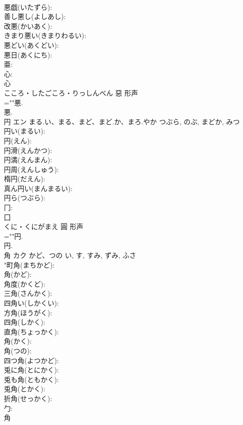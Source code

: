 \documentclass[8pt]{extreport}
\begin{document}
\begin{CJK}{UTF8}{min}
\\	悪戯(いたずら): 
\\	善し悪し(よしあし): 
\\	改悪(かいあく): 
\\	きまり悪い(きまりわるい): 
\\	悪どい(あくどい): 
\\	悪日(あくにち): 
\\	亜: 
\\	心: 
\\	心	
\\	こころ・したごころ・りっしんべん	惡	形声 
\\	=""悪.
\\	悪.
\\	円	エン	まる.い、まる、まど、まど.か、まろ.やか	つぶら, のぶ, まどか, みつ	
\\	円い(まるい): 
\\	円(えん): 
\\	円滑(えんかつ): 
\\	円満(えんまん): 
\\	円周(えんしゅう): 
\\	楕円(だえん): 
\\	真ん円い(まんまるい): 
\\	円ら(つぶら): 
\\	冂: 
\\	囗	
\\	くに・くにがまえ	圓	形声 
\\	=""円.
\\	円.
\\	角	カク	かど、つの	い, す, すみ, ずみ, ふさ	
\\	"町角(まちかど): 
\\	角(かど): 
\\	角度(かくど): 
\\	三角(さんかく): 
\\	四角い(しかくい): 
\\	方角(ほうがく): 
\\	四角(しかく): 
\\	直角(ちょっかく): 
\\	角(かく): 
\\	角(つの): 
\\	四つ角(よつかど): 
\\	兎に角(とにかく): 
\\	兎も角(ともかく): 
\\	兎角(とかく): 
\\	折角(せっかく): 
\\	勹: 
\\	角	

\end{CJK}
\end{document}
